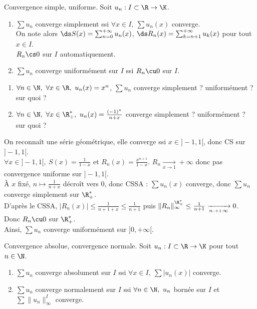 \documentclass[11pt]{article}
\begin{document}
\vspace*{-0.8cm}

\begin{defi}{Convergence simple, uniforme.}{}
    Soit $u_n:I\subset\R\to\K$.
    \begin{enumerate}
        \item $\sum u_n$ converge simplement ssi $\forall x \in I, ~ \sum u_n(x)$ converge.\\
        On note alors $\ds S(x)=\sum_{n=0}^{+\infty}u_n(x)$, $\ds R_n(x)=\sum_{k=n+1}^{+\infty}u_k(x)$ pour tout $x\in I$.\\
        $R_n\cs0$ sur $I$ automatiquement.
        \item $\sum u_n$ converge uniformément sur $I$ ssi $R_n\cu0$ sur $I$.
    \end{enumerate}
\end{defi}

\vspace*{-0.8cm}

\begin{ex}{}{}
    \begin{enumerate}
        \item $\forall n \in \N, ~ \forall x \in \R, ~ u_n(x)=x^n$, $\sum u_n$ converge simplement ? uniformément ? sur quoi ?
        \item $\forall n \in \N, ~ \forall x \in \R_+^*, ~ u_n(x)=\frac{(-1)^n}{n+x}$ converge simplement ? uniformément ? sur quoi ?
    \end{enumerate}
    \tcblower
     On reconnaît une série géométrique, elle converge ssi $x\in]-1,1[$, donc CS sur $]-1,1[$.\\
    $\forall x \in ]-1,1[, ~ S(x)=\frac{1}{1-x}$ et $R_n(x)=\frac{x^{n+1}}{1-x}$. $R_n\xrightarrow[x\to1]{}+\infty$ donc pas convergence uniforme sur $]-1,1[$.\\
     À $x$ fixé, $n\mapsto\frac{1}{n+x}$ décroît vers 0, donc CSSA : $\sum u_n(x)$ converge, donc $\sum u_n$ converge simplement sur $\R_+^*$.\\
    D'après le CSSA, $|R_n(x)|\leq\frac{1}{n+1+x}\leq\frac{1}{n+1}$ puis $\|R_n\|_\infty^{\R_+^*}\leq\frac{1}{n+1}\xrightarrow[n\to+\infty]{}0$. Donc $R_n\cu0$ sur $\R_+^*$.\\
    Ainsi, $\sum u_n$ converge uniformément sur $]0,+\infty[$. 
\end{ex}

\vspace*{-0.8cm}

\begin{defi}{Convergence absolue, convergence normale.}{}
    Soit $u_n:I\subset\R\to\K$ pour tout $n\in\N$.
    \begin{enumerate}
        \item $\sum u_n$ converge absolument sur $I$ ssi $\forall x \in I, ~ \sum|u_n(x)|$ converge.
        \item $\sum u_n$ converge normalement sur $I$ ssi $\forall n \in \N, ~ u_n$ bornée sur $I$ et $\sum\|u_n\|_\infty^I$ converge.
    \end{enumerate}
\end{defi}
\end{document}

